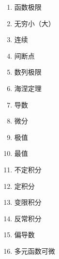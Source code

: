 \documentclass[a4paper,12pt]{article}
\begin{document}
    \vspace{1em}
    \begin{enumerate}[itemsep=1.2em]
        \item 函数极限
        \item 无穷小（大）
        \item 连续
        \item 间断点
        \item 数列极限
        \item 海涅定理
        \item 导数
        \item 微分
        \item 极值
        \item 最值
        \item 不定积分
        \item 定积分
        \item 变限积分
        \item 反常积分
        \item 偏导数
        \item 多元函数可微
    \end{enumerate}
\end{document}
